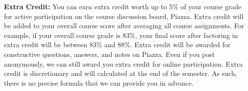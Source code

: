 \documentclass[11pt, letterpaper]{article}
\begin{document}
\medskip

\noindent \textbf{Extra Credit:} 
You can earn extra credit worth up to 5\% of your course grade for active participation on the course discussion board, Piazza.
Extra credit will be added to your overall course score after averaging all course assignments.
For example, if your overall course grade is 83\%, your final score after factoring in extra credit will be between 83\% and 88\%.
Extra credit will be awarded for constructive questions, answers, and notes on Piazza.
Even if you post anonymously, we can still award you extra credit for online participation.
Extra credit is discretionary and will calculated at the end of the semester.
As such, there is no precise formula that we can provide you in advance.

\end{document}
